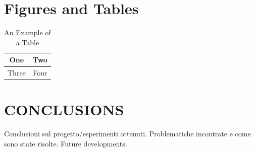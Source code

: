 \documentclass[letterpaper, 10 pt, conference]{ieeeconf}  %
\begin{document}
\section{Figures and Tables}

\begin{table}[h]
\caption{An Example of a Table}
\label{table_example}
\begin{center}
\begin{tabular}{|c||c|}
\hline
One & Two\\
\hline
Three & Four\\
\hline
\end{tabular}
\end{center}
\end{table}

\section{CONCLUSIONS}

Conclusioni sul progetto/esperimenti ottenuti.
Problematiche incontrate e come sono state risolte.
Future developments.

\addtolength{\textheight}{-12cm}   %
%
%
%




\end{document}

